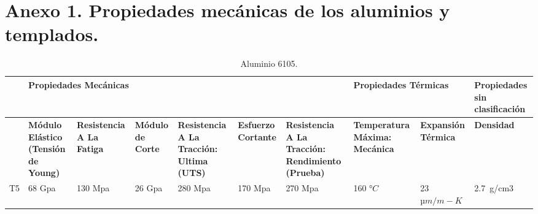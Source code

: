 \chapter{Anexo 1. Propiedades mecánicas de los aluminios y templados.}

\begin{landscape}
	\begin{table}[H]
		\centering
		\small
		\caption{Aluminio 6105.} 
		\begin{tabular}{|p{1.5em}|p{5.355em}|p{5.355em}|p{5.355em}|p{5.355em}|p{4.645em}|p{7em}|p{6.285em}|p{5.8em}|p{5.93em}|}
			\hline
			\multicolumn{1}{|r|}{} & \multicolumn{6}{p{39.995em}|}{\cellcolor[rgb]{ .851,  .882,  .949}\textbf{Propiedades Mecánicas}} & \multicolumn{2}{p{13.64em}|}{\cellcolor[rgb]{ .988,  .894,  .839}\textbf{Propiedades Térmicas}} & \cellcolor[rgb]{ 1,  .949,  .8}\textbf{Propiedades sin clasificación} \\
			\hline
			\multicolumn{1}{|r|}{} & \cellcolor[rgb]{ .851,  .882,  .949}\textbf{Módulo Elástico (Tensión de Young)} & \cellcolor[rgb]{ .851,  .882,  .949}\textbf{Resistencia A La Fatiga} & \cellcolor[rgb]{ .851,  .882,  .949}\textbf{Módulo de Corte} & \cellcolor[rgb]{ .851,  .882,  .949}\textbf{Resistencia A La Tracción: Ultima (UTS)} & \cellcolor[rgb]{ .851,  .882,  .949}\textbf{Esfuerzo Cortante} & \cellcolor[rgb]{ .851,  .882,  .949}\textbf{Resistencia A La Tracción: Rendimiento (Prueba)} & \cellcolor[rgb]{ .988,  .894,  .839}\textbf{Temperatura Máxima: Mecánica} & \cellcolor[rgb]{ .988,  .894,  .839}\textbf{Expansión Térmica} & \cellcolor[rgb]{ 1,  .949,  .8}\textbf{Densidad} \\
			\hline
			T5    & 68 Gpa & 130 Mpa & 26 Gpa & 280 Mpa & 170 Mpa & 270 Mpa & 160 $°C$ & 23  $µm/m-K$ & 2.7 g/cm3 \\
			\hline
		\end{tabular}%
		\label{tab:Alu6105}%
		
	\end{table}%


\end{landscape}
